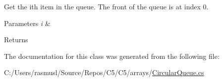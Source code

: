 Get the i\textquotesingle{}th item in the queue. The front of the queue is at index 0. 


\begin{DoxyParams}{Parameters}
{\em i} & \\
\hline
\end{DoxyParams}
\begin{DoxyReturn}{Returns}

\end{DoxyReturn}


The documentation for this class was generated from the following file\+:\begin{DoxyCompactItemize}
\item 
C\+:/\+Users/rasmusl/\+Source/\+Repos/\+C5/\+C5/arrays/\hyperlink{_circular_queue_8cs}{Circular\+Queue.\+cs}\end{DoxyCompactItemize}
